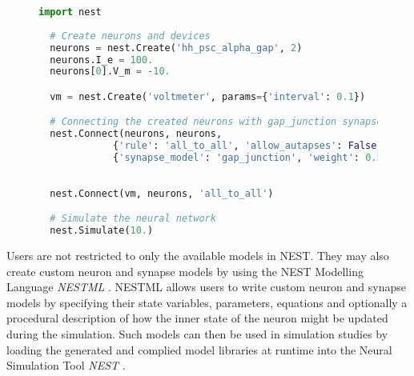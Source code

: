 \begin{figure}[ht!]
  \centering
  \begin{lstlisting}[language=Python, label=lst:simple_simulation, caption={Every simulation script using the PyNESt module starts with impoting the \texttt{nest} module in Python. In the fourth line, we create two Hodgkin-Huxley neurons as  instance of the \emph{hh\_psc\_alpha\_gap} model. In the fifth line, we set both neurons to recieve a constant current of 100.0 pA. In the sixth line, we only modifiy the membrane potentials of the first neuron instance and set it to -10. In the eighth line, we create a voltmeter to record the changes in the membrane potential for both neurons. In the eleventh line, we connect the first neuron with the second neuron, and vice-versa. The \emph{gap\_junction} synapse model is used in the created connections between the first and second neuron. Finlay, we connect the  voltmeter to the neurons to activlay record the changes in the membrane potential. In the last line, we call the \texttt{Simulate} function to start the simulation for 10 miliseconds.}, captionpos=b]
  import nest
 
  # Create neurons and devices
  neurons = nest.Create('hh_psc_alpha_gap', 2)
  neurons.I_e = 100.
  neurons[0].V_m = -10.

  vm = nest.Create('voltmeter', params={'interval': 0.1})

  # Connecting the created neurons with gap_junction synapse model
  nest.Connect(neurons, neurons,
             {'rule': 'all_to_all', 'allow_autapses': False},
             {'synapse_model': 'gap_junction', 'weight': 0.5})
  
  
  nest.Connect(vm, neurons, 'all_to_all')

  # Simulate the neural network
  nest.Simulate(10.)
  \end{lstlisting}
  \end{figure}

Users are not restricted to only the available models in NEST. They may also create custom neuron and synapse models by using the  NEST Modelling Language \emph{NESTML} \citep{plotnikov2016nestml, linssen_charl_a_p_2022_5784175}. NESTML allows users to write custom neuron and synapse models by specifying their state variables, parameters, equations and optionally a procedural description of how the inner state of the neuron might be updated during the simulation. Such models can then be used in simulation studies by loading the generated and complied model libraries at runtime into the Neural Simulation Tool \emph{NEST} \citep{spreizer_sebastian_2022_6368024}. 

